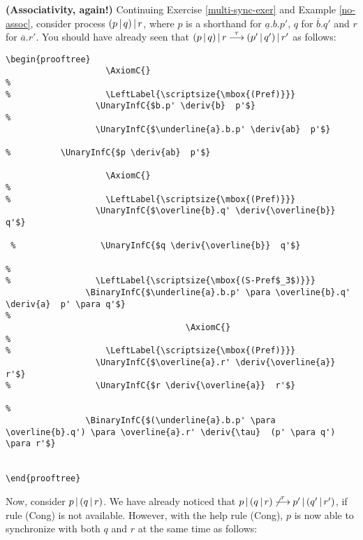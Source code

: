 \begin{example}\label{multi-synch2}{\bf (Associativity, again!)} 
Continuing Exercise \ref{multi-sync-exer} and Example \ref{no-assoc}, consider process 
$(p \mbox{$\,|\,$} q) \mbox{$\,|\,$} r$, where $p$ is a shorthand for $\underline{a}.b.p'$, $q$ for $\overline{b}.q'$ and $r$ for
$\overline{a}.r'$. You should have already
seen that  $(p \mbox{$\,|\,$} q) \mbox{$\,|\,$} r {\mbox{${\:\stackrel{\tau}{\longrightarrow}\:}$}} (p' \mbox{$\,|\,$} q') \mbox{$\,|\,$} r'$ as follows:

\begin{center}
\begin{verbatim}
\begin{prooftree}
                    \AxiomC{}
%
%                   \LeftLabel{\scriptsize{\mbox{(Pref)}}}
                  \UnaryInfC{$b.p' \deriv{b}  p'$}
%
                  \UnaryInfC{$\underline{a}.b.p' \deriv{ab}  p'$}
                  
%          \UnaryInfC{$p \deriv{ab}  p'$}

                    \AxiomC{}
%
%                   \LeftLabel{\scriptsize{\mbox{(Pref)}}}
                  \UnaryInfC{$\overline{b}.q' \deriv{\overline{b}}  q'$}

 %                 \UnaryInfC{$q \deriv{\overline{b}}  q'$}

%
%                 \LeftLabel{\scriptsize{\mbox{(S-Pref$_3$)}}}
                \BinaryInfC{$\underline{a}.b.p' \para \overline{b}.q' \deriv{a}  p' \para q'$}
%         
                                    \AxiomC{}
%
%                   \LeftLabel{\scriptsize{\mbox{(Pref)}}}
                  \UnaryInfC{$\overline{a}.r' \deriv{\overline{a}}  r'$}
%                 \UnaryInfC{$r \deriv{\overline{a}}  r'$}

%
                \BinaryInfC{$(\underline{a}.b.p' \para \overline{b}.q') \para \overline{a}.r' \deriv{\tau}  (p' \para q') \para r'$}
                

\end{prooftree}

\end{verbatim}

\end{center}


Now, consider
$p \mbox{$\,|\,$} (q \mbox{$\,|\,$} r)$. We have already
noticed that  $p \mbox{$\,|\,$} (q \mbox{$\,|\,$} r) {\mbox{${\:\not\stackrel{\tau}{\longrightarrow}\:}$}} p' \mbox{$\,|\,$} (q' \mbox{$\,|\,$} r')$, if rule (Cong) is not available.
However, with the help rule (Cong), $p$ is now able to synchronize with both $q$ and $r$ at the same time as follows:


\end{example}
